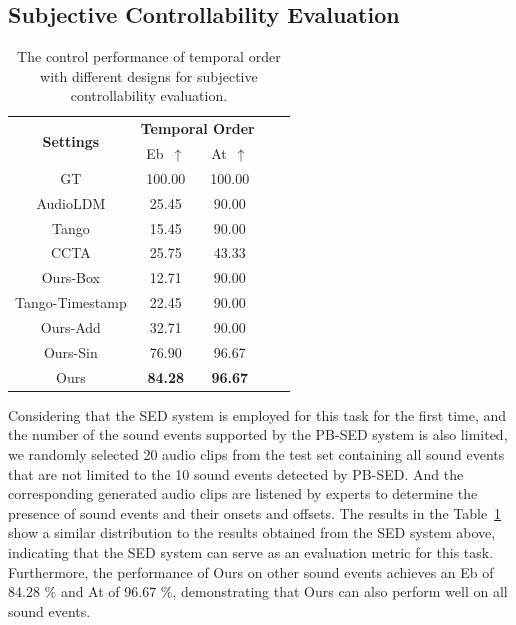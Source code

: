 \documentclass[letterpaper]{article}
\begin{document}
\subsection{Subjective Controllability Evaluation}


\begin{table}[!h]\footnotesize
    \centering
    \caption{The control performance of temporal order with different designs for subjective controllability evaluation.}
    \label{tab:subjective controllability evaluation}
        \begin{tabular}{c|cccc}
        \toprule
        \multirow{2}{*}{\textbf{Settings}} & \multicolumn{2}{c}{\textbf{Temporal Order}} \\
         & Eb~$\uparrow$ & At~$\uparrow$  \\
        \midrule
        \midrule
         GT & 100.00 & 100.00\\
         \midrule
         AudioLDM & 25.45 & 90.00 \\
         Tango & 15.45 & 90.00 \\
         CCTA & 25.75 & 43.33 \\
         Ours-Box & 12.71 & 90.00 \\
         Tango-Timestamp & 22.45 & 90.00 \\
         Ours-Add & 32.71 & 90.00 \\
         Ours-Sin & 76.90 & 96.67 \\
         Ours & \textbf{84.28} & \textbf{96.67} \\
        \bottomrule
        \end{tabular}
\end{table}

 Considering that the SED system is employed for this task for the first time, and the number of the sound events supported by the PB-SED system is also limited, we randomly selected 20 audio clips from the test set containing all sound events that are not limited to the 10 sound events detected by PB-SED. And the corresponding generated audio clips are listened by experts to determine the presence of sound events and their onsets and offsets. The results in the Table~\ref{tab:subjective controllability evaluation} show a similar distribution to the results obtained from the SED system above, indicating that the SED system can serve as an evaluation metric for this task. Furthermore, the performance of Ours on other sound events achieves an Eb of 84.28 \% and At of 96.67 \%, demonstrating that Ours can also perform well on all sound events.
\end{document}
